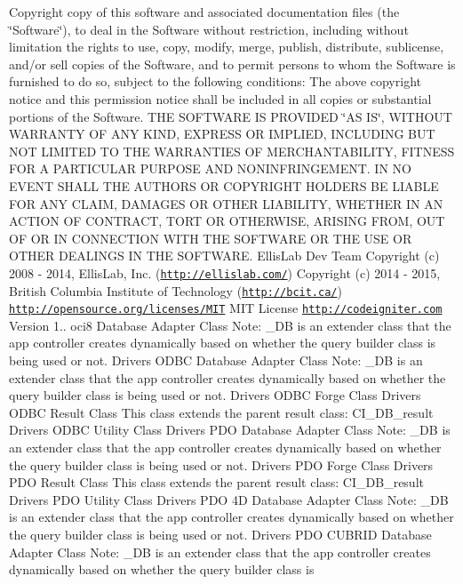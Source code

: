 \begin{DoxyCopyright}{Copyright}
copy of this software and associated documentation files (the \char`\"{}\+Software\char`\"{}), to deal in the Software without restriction, including without limitation the rights to use, copy, modify, merge, publish, distribute, sublicense, and/or sell copies of the Software, and to permit persons to whom the Software is furnished to do so, subject to the following conditions\+: The above copyright notice and this permission notice shall be included in all copies or substantial portions of the Software. T\+H\+E S\+O\+F\+T\+W\+A\+R\+E I\+S P\+R\+O\+V\+I\+D\+E\+D \char`\"{}\+A\+S I\+S\char`\"{}, W\+I\+T\+H\+O\+U\+T W\+A\+R\+R\+A\+N\+T\+Y O\+F A\+N\+Y K\+I\+N\+D, E\+X\+P\+R\+E\+S\+S O\+R I\+M\+P\+L\+I\+E\+D, I\+N\+C\+L\+U\+D\+I\+N\+G B\+U\+T N\+O\+T L\+I\+M\+I\+T\+E\+D T\+O T\+H\+E W\+A\+R\+R\+A\+N\+T\+I\+E\+S O\+F M\+E\+R\+C\+H\+A\+N\+T\+A\+B\+I\+L\+I\+T\+Y, F\+I\+T\+N\+E\+S\+S F\+O\+R A P\+A\+R\+T\+I\+C\+U\+L\+A\+R P\+U\+R\+P\+O\+S\+E A\+N\+D N\+O\+N\+I\+N\+F\+R\+I\+N\+G\+E\+M\+E\+N\+T. I\+N N\+O E\+V\+E\+N\+T S\+H\+A\+L\+L T\+H\+E A\+U\+T\+H\+O\+R\+S O\+R C\+O\+P\+Y\+R\+I\+G\+H\+T H\+O\+L\+D\+E\+R\+S B\+E L\+I\+A\+B\+L\+E F\+O\+R A\+N\+Y C\+L\+A\+I\+M, D\+A\+M\+A\+G\+E\+S O\+R O\+T\+H\+E\+R L\+I\+A\+B\+I\+L\+I\+T\+Y, W\+H\+E\+T\+H\+E\+R I\+N A\+N A\+C\+T\+I\+O\+N O\+F C\+O\+N\+T\+R\+A\+C\+T, T\+O\+R\+T O\+R O\+T\+H\+E\+R\+W\+I\+S\+E, A\+R\+I\+S\+I\+N\+G F\+R\+O\+M, O\+U\+T O\+F O\+R I\+N C\+O\+N\+N\+E\+C\+T\+I\+O\+N W\+I\+T\+H T\+H\+E S\+O\+F\+T\+W\+A\+R\+E O\+R T\+H\+E U\+S\+E O\+R O\+T\+H\+E\+R D\+E\+A\+L\+I\+N\+G\+S I\+N T\+H\+E S\+O\+F\+T\+W\+A\+R\+E.  Ellis\+Lab Dev Team  Copyright (c) 2008 -\/ 2014, Ellis\+Lab, Inc. (\href{http://ellislab.com/}{\tt http\+://ellislab.\+com/})  Copyright (c) 2014 -\/ 2015, British Columbia Institute of Technology (\href{http://bcit.ca/}{\tt http\+://bcit.\+ca/})  \href{http://opensource.org/licenses/MIT}{\tt http\+://opensource.\+org/licenses/\+M\+I\+T} M\+I\+T License  \href{http://codeigniter.com}{\tt http\+://codeigniter.\+com}  Version 1..  oci8 Database Adapter Class Note\+: \+\_\+\+D\+B is an extender class that the app controller creates dynamically based on whether the query builder class is being used or not.  Drivers O\+D\+B\+C Database Adapter Class Note\+: \+\_\+\+D\+B is an extender class that the app controller creates dynamically based on whether the query builder class is being used or not.  Drivers O\+D\+B\+C Forge Class  Drivers O\+D\+B\+C Result Class This class extends the parent result class\+: C\+I\+\_\+\+D\+B\+\_\+result  Drivers O\+D\+B\+C Utility Class  Drivers P\+D\+O Database Adapter Class Note\+: \+\_\+\+D\+B is an extender class that the app controller creates dynamically based on whether the query builder class is being used or not.  Drivers P\+D\+O Forge Class  Drivers P\+D\+O Result Class This class extends the parent result class\+: C\+I\+\_\+\+D\+B\+\_\+result  Drivers P\+D\+O Utility Class  Drivers P\+D\+O 4\+D Database Adapter Class Note\+: \+\_\+\+D\+B is an extender class that the app controller creates dynamically based on whether the query builder class is being used or not.  Drivers P\+D\+O C\+U\+B\+R\+I\+D Database Adapter Class Note\+: \+\_\+\+D\+B is an extender class that the app controller creates dynamically based on whether the query builder class is 
\end{DoxyCopyright}
